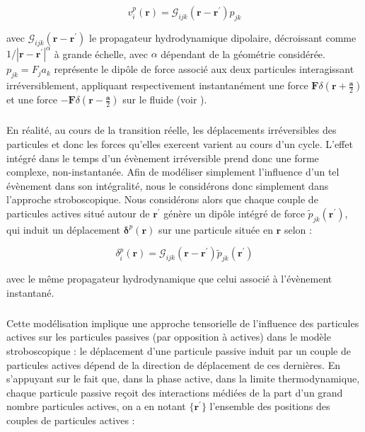 \begin{equation}
	v^p_i(\mathbf{r}) = \mathcal{G}_{ijk}(\mathbf{r}-\mathbf{r}^\prime)p_{jk}
\end{equation}

\noindent avec $\mathcal{G}_{ijk}(\mathbf{r}-\mathbf{r}^\prime)$ le propagateur hydrodynamique dipolaire, décroissant comme $1/|\mathbf{r}-\mathbf{r}^\prime|^\alpha$ à grande échelle, avec $\alpha$ dépendant de la géométrie considérée. $p_{jk} = F_j a_k$ représente le dipôle de force associé aux deux particules interagissant irréversiblement, appliquant respectivement instantanément une force $\mathbf{F}\delta(\mathbf{r}+\frac{\mathbf{a}}{2})$ et une force $-\mathbf{F}\delta(\mathbf{r}-\frac{\mathbf{a}}{2})$ sur le fluide (voir ).

\subparagraph{}En réalité, au cours de la transition réelle, les déplacements irréversibles des particules et donc les forces qu'elles exercent varient au cours d'un cycle. L'effet intégré dans le temps d'un évènement irréversible prend donc une forme complexe, non-instantanée. Afin de modéliser simplement l'influence d'un tel évènement dans son intégralité, nous le considérons donc simplement dans l'approche stroboscopique. Nous considérons alors que chaque couple de particules actives situé autour de $\mathbf{r}^\prime$ génère un dipôle intégré de force $\tilde{p}_{jk}(\mathbf{r}^\prime)$, qui induit un déplacement $\boldsymbol\delta^p(\mathbf{r})$ sur une particule située en $\mathbf{r}$ selon :

\begin{equation}
	\delta^p_i(\mathbf{r}) = \mathcal{G}_{ijk}(\mathbf{r}-\mathbf{r}^\prime)\tilde{p}_{jk}(\mathbf{r}^\prime)
\end{equation}

\noindent avec le même propagateur hydrodynamique que celui associé à l'évènement instantané.

\subparagraph{}Cette modélisation implique une approche tensorielle de l'influence des particules actives sur les particules passives (par opposition à actives) dans le modèle stroboscopique : le déplacement d'une particule passive induit par un couple de particules actives dépend de la direction de déplacement de ces dernières. En s'appuyant sur le fait que, dans la phase active, dans la limite thermodynamique, chaque particule passive reçoit des interactions médiées de la part d'un grand nombre particules actives, on a en notant $\{ \mathbf{r}^\prime \}$ l'ensemble des positions des couples de particules actives :

